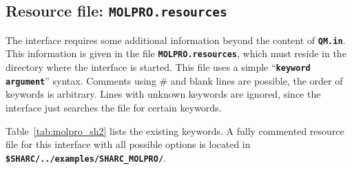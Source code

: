 \documentclass[a4paper,10pt,DIV=15,openany,twoside=false]{scrbook}
\newcommand{\ttt}[1]{\textbf{\texttt{#1}}}
\begin{document}
\subsection{Resource file: \ttt{MOLPRO.resources}}

The interface requires some additional information beyond the content of \ttt{QM.in}. This information is given in the file \ttt{MOLPRO.resources}, which must reside in the directory where the interface is started. This file uses a simple ``\ttt{keyword argument}'' syntax. Comments using \# and blank lines are possible, the order of keywords is arbitrary. Lines with unknown keywords are ignored, since the interface just searches the file for certain keywords.

Table~\ref{tab:molpro_sh2} lists the existing keywords.
A fully commented resource file for this interface with all possible options is located in \ttt{\$SHARC/../examples/SHARC\_MOLPRO/}.
\end{document}

